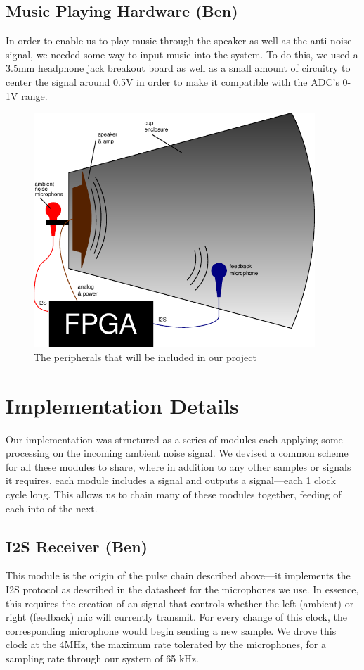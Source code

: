 \documentclass{fpgairpods}
\begin{document}
\subsection{Music Playing Hardware (Ben)}
In order to enable us to play music  through the speaker as well as the anti-noise signal, we needed some way to input music into the system. To do this, we used a 3.5mm headphone jack breakout board as well as a small amount of circuitry to center the signal around 0.5V in order to make it compatible with the ADC's 0-1V range.

\begin{figure}[h]
\centering
\includegraphics[width=300pt]{./figs/system_diagram_with_text.pdf}
\caption{The peripherals that will be included in our project}
\label{fig:peripherals}
\end{figure}

\section{Implementation Details}
Our implementation was structured as a series of modules each applying some processing on the incoming ambient noise signal. We devised a common scheme for all these modules to share, where in addition to any other samples or signals it requires, each module includes a  signal and outputs a  signal---each 1 clock cycle long. This allows us to chain many of these modules together, feeding  of each into  of the next.

\subsection{I2S Receiver (Ben)}
This module is the origin of the  pulse chain described above---it implements the I2S protocol as described in the datasheet\cite{mic_datasheet} for the microphones we use. In essence, this requires the creation of an  signal that controls whether the left (ambient) or right (feedback) mic will currently transmit. For every change of this clock, the corresponding microphone would begin sending a new sample. We drove this clock at the 4MHz, the maximum rate tolerated by the microphones, for a sampling rate through our system of 65 kHz.
\end{document}
